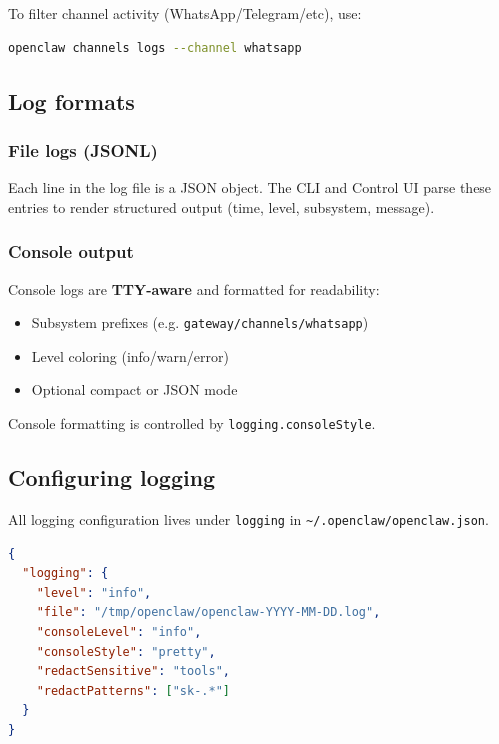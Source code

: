 To filter channel activity (WhatsApp/Telegram/etc), use:

\begin{lstlisting}[language=bash]
openclaw channels logs --channel whatsapp
\end{lstlisting}


\subsection{Log formats}


\subsubsection{File logs (JSONL)}


Each line in the log file is a JSON object. The CLI and Control UI parse these
entries to render structured output (time, level, subsystem, message).

\subsubsection{Console output}


Console logs are \textbf{TTY-aware} and formatted for readability:

\begin{itemize}
  \item Subsystem prefixes (e.g. \texttt{gateway/channels/whatsapp})
  \item Level coloring (info/warn/error)
  \item Optional compact or JSON mode
\end{itemize}


Console formatting is controlled by \texttt{logging.consoleStyle}.

\subsection{Configuring logging}


All logging configuration lives under \texttt{logging} in \texttt{\textasciitilde{}/.openclaw/openclaw.json}.

\begin{lstlisting}[language=json]
{
  "logging": {
    "level": "info",
    "file": "/tmp/openclaw/openclaw-YYYY-MM-DD.log",
    "consoleLevel": "info",
    "consoleStyle": "pretty",
    "redactSensitive": "tools",
    "redactPatterns": ["sk-.*"]
  }
}
\end{lstlisting}


